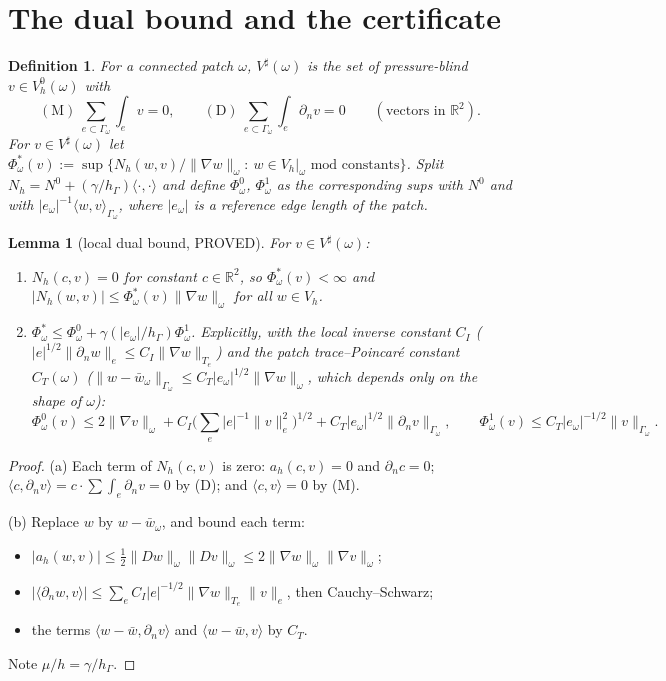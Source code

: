\documentclass[11pt]{article}
\newtheorem{lemma}[theorem]{Lemma}
\newtheorem{definition}[theorem]{Definition}
\theoremstyle{remark}
\newcommand{\hG}{h_\Gamma}
\newcommand{\ip}[2]{\langle #1,#2\rangle}
\begin{document}
\section{The dual bound and the certificate}
\begin{definition}
For a connected patch $\omega$, $V^\sharp(\omega)$ is the set of pressure-blind $v\in V_h^0(\omega)$ with
\[
\textstyle(\mathrm M)\ \sum_{e\subset\Gamma_\omega}\int_ev=0,\qquad(\mathrm D)\ \sum_{e\subset\Gamma_\omega}\int_e\partial_nv=0\qquad(\text{vectors in }\mathbb R^2).
\]
For $v\in V^\sharp(\omega)$ let $\Phi^\ast_\omega(v):=\sup\{N_h(w,v)/\|\nabla w\|_\omega:\ w\in V_h|_\omega\text{ mod constants}\}$. Split
$N_h=N^0+(\gamma/\hG)\ip{\cdot}{\cdot}$ and define $\Phi^0_\omega$, $\Phi^1_\omega$ as the corresponding sups with $N^0$ and with
$|e_\omega|^{-1}\ip{w}{v}_{\Gamma_\omega}$, where $|e_\omega|$ is a reference edge length of the patch.
\end{definition}

\begin{lemma}[local dual bound, PROVED]\label{lem:dual}
For $v\in V^\sharp(\omega)$:
\begin{enumerate}
\item[(a)] $N_h(c,v)=0$ for constant $c\in\mathbb R^2$, so $\Phi^\ast_\omega(v)<\infty$ and $|N_h(w,v)|\le\Phi^\ast_\omega(v)\|\nabla w\|_\omega$ for all
$w\in V_h$.
\item[(b)] $\Phi^\ast_\omega\le\Phi^0_\omega+\gamma(|e_\omega|/\hG)\Phi^1_\omega$. Explicitly, with the local inverse constant $C_I$
($|e|^{1/2}\|\partial_nw\|_e\le C_I\|\nabla w\|_{T_e}$) and the patch trace--Poincar\'e constant $C_T(\omega)$
($\|w-\bar w_\omega\|_{\Gamma_\omega}\le C_T|e_\omega|^{1/2}\|\nabla w\|_\omega$, which depends only on the shape of $\omega$):
\[
\Phi^0_\omega(v)\le2\|\nabla v\|_\omega+C_I\Big(\sum_{e}|e|^{-1}\|v\|_e^2\Big)^{1/2}+C_T|e_\omega|^{1/2}\|\partial_nv\|_{\Gamma_\omega},\qquad
\Phi^1_\omega(v)\le C_T|e_\omega|^{-1/2}\|v\|_{\Gamma_\omega}.
\]
\end{enumerate}
\end{lemma}
\begin{proof}
(a) Each term of $N_h(c,v)$ is zero: $a_h(c,v)=0$ and $\partial_nc=0$; $\ip{c}{\partial_nv}=c\cdot\sum\int_e\partial_nv=0$ by (D); and
$\ip{c}{v}=0$ by (M).

(b) Replace $w$ by $w-\bar w_\omega$, and bound each term:
\begin{itemize}
\item $|a_h(w,v)|\le\tfrac12\|Dw\|_\omega\|Dv\|_\omega\le2\|\nabla w\|_\omega\|\nabla v\|_\omega$;
\item $|\ip{\partial_nw}{v}|\le\sum_e C_I|e|^{-1/2}\|\nabla w\|_{T_e}\|v\|_e$, then Cauchy--Schwarz;
\item the terms $\ip{w-\bar w}{\partial_nv}$ and $\ip{w-\bar w}{v}$ by $C_T$.
\end{itemize}
Note $\mu/h=\gamma/\hG$.
\end{proof}
\end{document}
